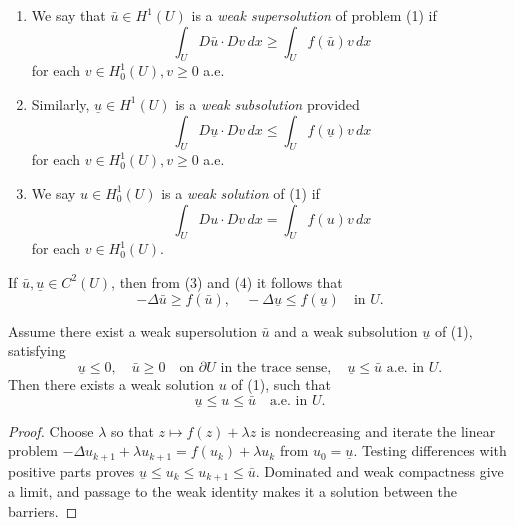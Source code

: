 \begin{definition}
\label{def:weak-sub-supersolution}
\begin{enumerate}
\item[(i)] We say that $\bar{u} \in H^1(U)$ is a \textit{weak supersolution} of problem (1) if
\[
\int_U D\bar{u} \cdot Dv \, dx \geq \int_U f(\bar{u})v \, dx
\tag{3}
\]
for each $v \in H^1_0(U), v \geq 0$ a.e.
\item[(ii)] Similarly, $\underline{u} \in H^1(U)$ is a \textit{weak subsolution} provided
\[
\int_U D\underline{u} \cdot Dv \, dx \leq \int_U f(\underline{u})v \, dx
\tag{4}
\]
for each $v \in H^1_0(U), v \geq 0$ a.e.
\item[(iii)] We say $u \in H^1_0(U)$ is a \textit{weak solution} of (1) if
\[
\int_U Du \cdot Dv \, dx = \int_U f(u)v \, dx
\]
for each $v \in H^1_0(U)$.
\end{enumerate}
\end{definition}

\begin{remark}
\label{rem:sub-supersolution-c2-case}

If $\bar{u}, \underline{u} \in C^2(U)$, then from (3) and (4) it follows that
\[
-\Delta \bar{u} \geq f(\bar{u}), \quad -\Delta \underline{u} \leq f(\underline{u}) \quad \text{in } U.
\]
\end{remark}

\begin{theorem}
\label{thm:existence-between-sub-supersolutions}

Assume there exist a weak supersolution $\bar{u}$ and a weak subsolution $\underline{u}$ of (1), satisfying
\[
\underline{u} \leq 0, \quad \bar{u} \geq 0 \quad \text{on } \partial U \text{ in the trace sense}, \quad \underline{u} \leq \bar{u} \text{ a.e. in } U.
\tag{5}
\]
Then there exists a weak solution $u$ of (1), such that
\[
\underline{u} \leq u \leq \bar{u} \quad \text{a.e. in } U.
\]
\end{theorem}

\begin{proof}
\sketch Choose $\lambda$ so that $z\mapsto f(z)+\lambda z$ is nondecreasing and iterate the linear problem $-\Delta u_{k+1}+\lambda u_{k+1}=f(u_k)+\lambda u_k$ from $u_0=\underline u$. Testing differences with positive parts proves $\underline u\leq u_k\leq u_{k+1}\leq\bar u$. Dominated and weak compactness give a limit, and passage to the weak identity makes it a solution between the barriers.
\end{proof}

